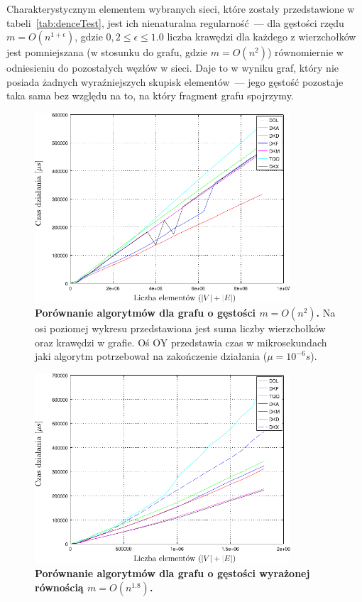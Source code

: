 Charakterystycznym elementem wybranych sieci, które zostały przedstawione w tabeli~\ref{tab:denceTest}, jest ich nienaturalna regularność~--- dla gęstości rzędu $m = O \left( n^{1+\epsilon}\right)$, gdzie $0,2 \leqslant \epsilon \leqslant 1.0$ liczba krawędzi dla każdego z wierzchołków jest pomniejszana (w stosunku do grafu, gdzie $m = O \left( n^{2}\right)$) równomiernie w odniesieniu do pozostałych węzłów w sieci.
Daje to w wyniku graf, który nie posiada żadnych wyraźniejszych skupisk elementów~--- jego gęstość pozostaje taka sama bez względu na to, na który fragment grafu spojrzymy.

\begin{figure}[!htbp]
	\null\hfill
	\includegraphics[width=0.85\textwidth]{Chapter_IV/fullGraph200_psfrag.pdf}
	\hfill\null
	\caption{
		\textbf{Porównanie algorytmów dla grafu o gęstości $m = O \left( n^{2} \right)$.}
		Na osi poziomej wykresu przedstawiona jest suma liczby wierzchołków oraz krawędzi w grafie.
		Oś \textsc{OY} przedstawia czas w mikrosekundach jaki algorytm potrzebował na zakończenie działania ($\mu = 10^{-6} s$).
	}
	\label{fig:plotFullGraph_2.00}
\end{figure}

\begin{figure}[!htbp]
	\null\hfill
	\includegraphics[width=0.85\textwidth]{Chapter_IV/graph180_psfrag.pdf}
	\hfill\null
	\caption{
		\textbf{Porównanie algorytmów dla grafu o gęstości wyrażonej równością $m = O \left( n^{1.8} \right)$.}
	}
	\label{fig:plotFullGraph_1.80}
\end{figure}

